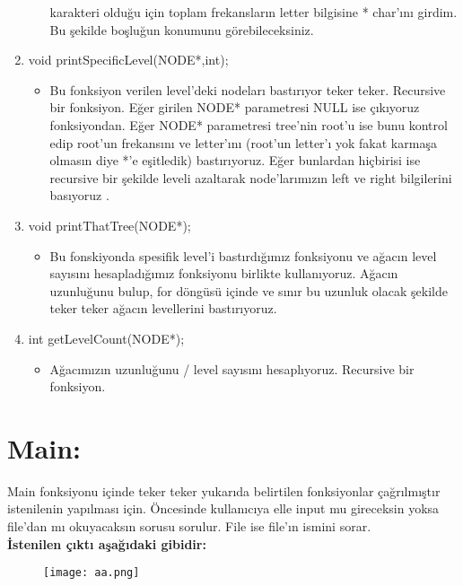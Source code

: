 \documentclass[11pt]{article}
\begin{document}
\begin{enumerate}
\begin{itemize}
		  karakteri olduğu için toplam frekansların letter bilgisine * 
		  char'ını girdim. Bu şekilde boşluğun konumunu görebileceksiniz.
	\end{itemize}
\item void printSpecificLevel(NODE*,int);
	\begin{itemize}
	\item Bu fonksiyon verilen level'deki nodeları bastırıyor teker teker.
		  Recursive bir fonksiyon. Eğer girilen NODE* parametresi NULL ise 
		  çıkıyoruz fonksiyondan. Eğer NODE* parametresi tree'nin root'u ise
		  bunu kontrol edip root'un frekansını ve letter'ını (root'un 
		  letter'ı yok fakat karmaşa olmasın diye *'e eşitledik) 
		  bastırıyoruz. Eğer bunlardan hiçbirisi ise recursive bir şekilde 
		  leveli azaltarak node'larımızın left ve right bilgilerini basıyoruz
		  .
	\end{itemize}
\item void printThatTree(NODE*);
	\begin{itemize}
	\item Bu fonskiyonda spesifik level'i bastırdığımız fonksiyonu ve ağacın
		  level sayısını hesapladığımız fonksiyonu birlikte kullanıyoruz.
		  Ağacın uzunluğunu bulup, for döngüsü içinde ve sınır bu uzunluk
		  olacak şekilde teker teker ağacın levellerini bastırıyoruz.
	\end{itemize}
\item int getLevelCount(NODE*);
	\begin{itemize}
	\item Ağacımızın uzunluğunu / level sayısını hesaplıyoruz. Recursive bir 
	fonksiyon. 
	\end{itemize}
\end{enumerate}
\section{Main:}
\hspace*{1cm} Main fonksiyonu içinde teker teker yukarıda belirtilen fonksiyonlar çağrılmıştır istenilenin yapılması için. Öncesinde kullanıcıya elle input mu gireceksin yoksa file'dan mı okuyacaksın sorusu sorulur. File ise file'ın ismini sorar. 
\pagebreak
\\
\hspace*{1cm} \Large{\textbf{İstenilen çıktı aşağıdaki gibidir:}}

\begin{figure}[htbp] %
\texttt{[image: aa.png]} 
\end{figure}
\hspace*{1cm} 
\end{document}
